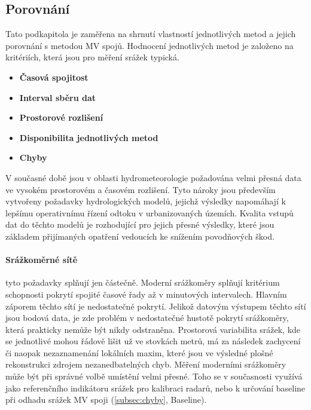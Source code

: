 \documentclass[a4paper,12pt,oneside]{report}
\begin{document}
\subsection{Porovnání}
Tato podkapitola je zaměřena na shrnutí vlastností jednotlivých metod a jejich porovnání s metodou MV spojů. Hodnocení jednotlivých metod je založeno na kritériích, která jsou pro měření srážek typická.
\begin{itemize}
\item\textbf{Časová spojitost}
\item\textbf{Interval sběru dat}  
\item\textbf{Prostorové rozlišení}
\item\textbf{Disponibilita jednotlivých metod}
\item\textbf{Chyby}
\end{itemize}
V současné době jsou v oblasti hydrometeorologie požadována velmi přesná data ve vysokém prostorovém a časovém rozlišení. Tyto nároky jsou především vytvořeny požadavky hydrologických modelů, jejichž výsledky napomáhají k lepšímu operativnímu řízení odtoku v urbanizovaných územích. Kvalita vstupů dat do těchto modelů je rozhodující pro jejich přesné výsledky, které jsou základem přijímaných opatření vedoucích ke snížením povodňových škod.

\paragraph*{Srážkoměrné sítě} 
tyto požadavky splňují jen částečně. Moderní srážkoměry splňují kritérium schopnosti pokrytí spojité časové řady až v minutových intervalech. Hlavním záporem těchto sítí je nedostatečné pokrytí. Jelikož datovým výstupem těchto sítí jsou bodová data, je zde problém v nedostatečné hustotě pokrytí srážkoměry, která prakticky nemůže být nikdy odstraněna. Prostorová variabilita srážek, kde se jednotlivé mohou řádově lišit už ve stovkách metrů, má za následek zachycení či naopak nezaznamenání lokálních maxim, které jsou ve výsledné plošné rekonstrukci zdrojem nezanedbatelných chyb. Měření moderními srážkoměry může být při správné volbě umístění velmi přesné. Toho se v současnosti využívá jako referenčního indikátoru srážek pro kalibraci radarů, nebo k určování baseline při odhadu srážek MV spoji (\ref{subsec:chyby}, Baseline).
\end{document}
